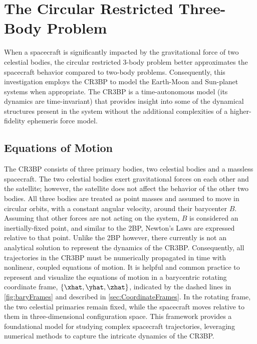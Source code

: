 \section{The Circular Restricted Three-Body Problem}\label{sec:CR3BP}
When a spacecraft is significantly impacted by the gravitational force of two celestial bodies, the
circular restricted 3-body problem better approximates the spacecraft behavior compared to two-body
problems. Consequently, this investigation employs the CR3BP to model the Earth-Moon and Sun-planet
systems when appropriate. The CR3BP is a time-autonomous model (its dynamics are time-invariant)
that provides insight into some of the dynamical structures present in the system without the
additional complexities of a higher-fidelity ephemeris force model.

\subsection{Equations of Motion}
The CR3BP consists of three primary bodies, two celestial bodies and a massless spacecraft. The two
celestial bodies exert gravitational forces on each other and the satellite; however, the satellite
does not affect the behavior of the other two bodies. All three bodies are treated as point masses
and assumed to move in circular orbits, with a constant angular velocity, around their barycenter
$B$. Assuming that other forces are not acting on the system, $B$ is considered an inertially-fixed
point, and similar to the 2BP, Newton's Laws are expressed relative to that point. Unlike the 2BP
however, there currently is not an analytical solution to represent the dynamics of the CR3BP.
Consequently, all trajectories in the CR3BP must be numerically propagated in time with nonlinear,
coupled equations of motion. It is helpful and common practice to represent and visualize the
equations of motion in a barycentric rotating coordinate frame, $\{\xhat,\yhat,\zhat\}$, indicated
by the dashed lines in \cref{fig:baryFrames} and described in \cref{sec:CoordinateFrames}. In the
rotating frame, the two celestial primaries remain fixed, while the spacecraft moves relative to
them in three-dimensional configuration space. This framework provides a foundational model for
studying complex spacecraft trajectories, leveraging numerical methods to capture the intricate
dynamics of the CR3BP.

